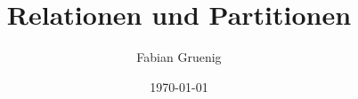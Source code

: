 


\providecommand\CONFonetwostyle{oneside}
\providecommand\CONFdraftfinal{final}











\title{Relationen und Partitionen}
\author{Fabian Gruenig}
\date{\today}


\clearscrheadfoot

\ihead{\leftmark}
\ohead{\rightmark}

\ifoot{}
\ofoot{\thepage}









\newpage


\newpage


\newpage



% 

% 
% 



